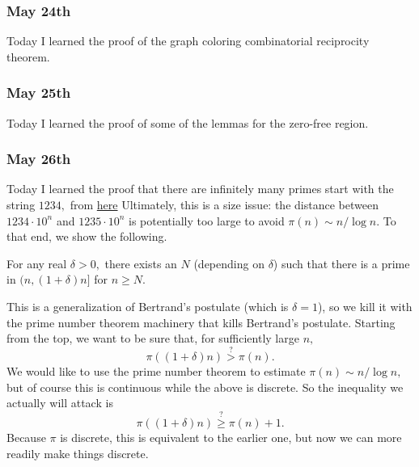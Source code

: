 \subsubsection{May 24th}
Today I learned the proof of the graph coloring combinatorial reciprocity theorem.\todo{}

\subsubsection{May 25th}
Today I learned the proof of some of the lemmas for the zero-free region.\todo{}

\subsubsection{May 26th}
Today I learned the proof that there are infinitely many primes start with the string $1234,$ from \href{https://math.stackexchange.com/a/61538/869257}{here} Ultimately, this is a size issue: the distance between $1234\cdot10^n$ and $1235\cdot10^n$ is potentially too large to avoid $\pi(n)\sim n/\log n.$ To that end, we show the following.
\begin{lemma}
    For any real $\delta>0,$ there exists an $N$ (depending on $\delta$) such that there is a prime in $(n,(1+\delta)n]$ for $n\ge N.$
\end{lemma}
This is a generalization of Bertrand's postulate (which is $\delta=1$), so we kill it with the prime number theorem machinery that kills Bertrand's postulate. Starting from the top, we want to be sure that, for sufficiently large $n,$
\[\pi((1+\delta)n)\stackrel?>\pi(n).\]
We would like to use the prime number theorem to estimate $\pi(n)\sim n/\log n,$ but of course this is continuous while the above is discrete. So the inequality we actually will attack is
\[\pi((1+\delta)n)\stackrel?\ge\pi(n)+1.\]
Because $\pi$ is discrete, this is equivalent to the earlier one, but now we can more readily make things discrete.

